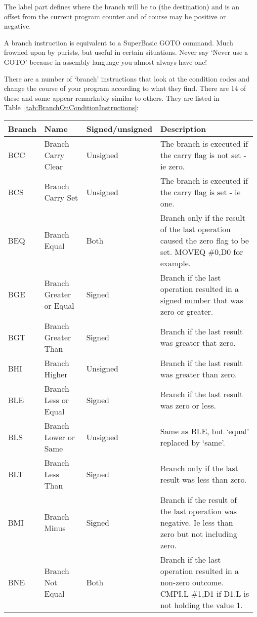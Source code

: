 The label part defines where the branch will be to (the destination)
    and is an offset from the current program counter and of course may be
    positive or negative.

A branch instruction is equivalent to a SuperBasic GOTO command. Much frowned upon
by purists, but useful in certain situations. Never say `Never use a GOTO' because in
assembly language you almost always have one!

There are a number of `branch' instructions that look at the
    condition codes and change the course of your program according to what
    they find. There are 14 of these and some appear remarkably similar to
    others. They are listed in Table~\ref{tab:BranchOnConditionInstructions}:

\begin{table}[htbp]
\centering
\begin{tabular}{l l l p{}}
\toprule
\textbf{Branch} & \textbf{Name} & \textbf{Signed/unsigned} & \textbf{Description}\\
\midrule
BCC & Branch Carry Clear      & Unsigned & The branch is executed if the carry flag is not set -{} ie zero.\\
BCS & Branch Carry Set        & Unsigned & The branch is executed if the carry flag is set -{} ie one.\\
BEQ & Branch Equal            & Both     & Branch only if the result of the last operation caused the zero flag to be set. MOVEQ \#0,D0 for example.\\
BGE & Branch Greater or Equal & Signed   & Branch if the last operation resulted in a signed number that was zero or greater.\\
BGT & Branch Greater Than     & Signed   & Branch if the last result was greater that zero.\\
BHI & Branch Higher           & Unsigned & Branch if the last result was greater than zero.\\
BLE & Branch Less or Equal    & Signed   & Branch if the last result was zero or less.\\
BLS & Branch Lower or Same    & Unsigned & Same as BLE, but `equal' replaced by `same'.\\
BLT & Branch Less Than        & Signed   & Branch only if the last result was less than zero.\\
BMI & Branch Minus            & Signed   & Branch if the result of the last operation was negative. Ie less than zero but not including zero.\\
BNE & Branch Not Equal        & Both     & Branch if the last operation resulted in a non-{}zero outcome. CMPI.L \#1,D1 if D1.L is not holding the value 1.\\

\end{tabular}
\end{table}
